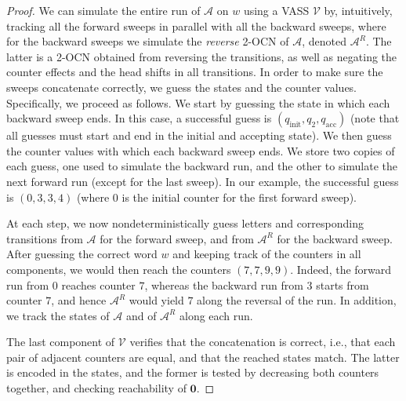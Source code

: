 \documentclass[USenglish]{lipics-v2021}
\newcommand{\initstate}{q_{\mathrm{init}}}
\newcommand{\accstate}{q_{\mathrm{acc}}}
\renewcommand{\vec}[1]{\boldsymbol{#1}}
\newcommand{\cA}{\mathcal{A}}
\newcommand{\cV}{\mathcal{V}}
\begin{document}
\begin{proof}
	We can simulate the entire run of $\cA$ on $w$ using a VASS $\cV$ by,
	intuitively, tracking all the forward sweeps in parallel with all the backward
	sweeps, where for the backward sweeps we simulate the \emph{reverse} 2-OCN of
	$\cA$, denoted $\cA^R$. The latter is a 2-OCN obtained from reversing the
	transitions, as well as negating the counter effects and the head shifts in all
	transitions.  In order to make sure the sweeps concatenate correctly, we guess
	the states and the counter values. Specifically, we proceed as follows.  We
	start by guessing the state in which each backward sweep ends. In this case, a
	successful guess is $(\initstate,q_2,\accstate)$ (note that all guesses must
	start and end in the initial and accepting state). We then guess the counter
	values with which each backward sweep ends. We store two copies of each guess,
	one used to simulate the backward run, and the other to simulate the next
	forward run (except for the last sweep). In our example, the successful guess is
	$(0,3,3,4)$ (where $0$ is the initial counter for the first forward sweep).
	
	At each step, we now nondeterministically guess letters and corresponding
	transitions from $\cA$ for the forward sweep, and from $\cA^R$ for the backward
	sweep. After guessing the correct word $w$ and keeping track of the counters in
	all components, we would then reach the counters $(7,7,9,9)$. Indeed, the
	forward run from $0$ reaches counter $7$, whereas the backward run from $3$
	starts from counter $7$, and hence $\cA^R$ would yield $7$ along the reversal of
	the run. In addition, we track the states of $\cA$ and of $\cA^R$ along each
	run.
	
	The last component of $\cV$ verifies that the concatenation is correct,
	i.e., that each pair of adjacent counters are equal, and that the reached states
	match. The latter is encoded in the states, and the former is tested by
	decreasing both counters together, and checking reachability of $\vec{0}$.
	

\end{proof}
\end{document}
